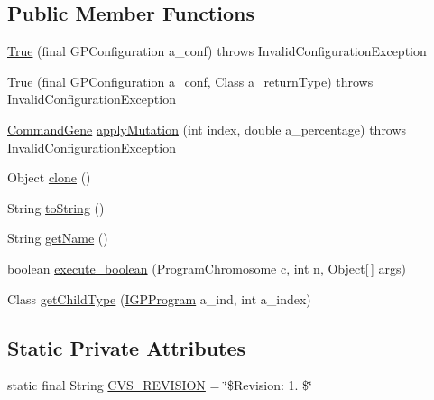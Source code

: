 \subsection*{Public Member Functions}
\begin{DoxyCompactItemize}
\item 
\hyperlink{classorg_1_1jgap_1_1gp_1_1terminal_1_1_true_a158a3e9011bb61e25eba96c3f6dec32f}{True} (final G\-P\-Configuration a\-\_\-conf)  throws Invalid\-Configuration\-Exception 
\item 
\hyperlink{classorg_1_1jgap_1_1gp_1_1terminal_1_1_true_ad1b44a3b970766b2ba8964f0914de178}{True} (final G\-P\-Configuration a\-\_\-conf, Class a\-\_\-return\-Type)  throws Invalid\-Configuration\-Exception 
\item 
\hyperlink{classorg_1_1jgap_1_1gp_1_1_command_gene}{Command\-Gene} \hyperlink{classorg_1_1jgap_1_1gp_1_1terminal_1_1_true_a916567d5d3517322184070c9fa468c34}{apply\-Mutation} (int index, double a\-\_\-percentage)  throws Invalid\-Configuration\-Exception 
\item 
Object \hyperlink{classorg_1_1jgap_1_1gp_1_1terminal_1_1_true_a491afe48eab8682fb9785a39e830c496}{clone} ()
\item 
String \hyperlink{classorg_1_1jgap_1_1gp_1_1terminal_1_1_true_af25df6de7cce1e53ef128273058a4a81}{to\-String} ()
\item 
String \hyperlink{classorg_1_1jgap_1_1gp_1_1terminal_1_1_true_a8f3a2e6dd8940ea041326604b5e6ee99}{get\-Name} ()
\item 
boolean \hyperlink{classorg_1_1jgap_1_1gp_1_1terminal_1_1_true_adb652c54d7c6ba735438712587ceb696}{execute\-\_\-boolean} (Program\-Chromosome c, int n, Object\mbox{[}$\,$\mbox{]} args)
\item 
Class \hyperlink{classorg_1_1jgap_1_1gp_1_1terminal_1_1_true_ad7813731ecd7b453223ac9b369b43fdc}{get\-Child\-Type} (\hyperlink{interfaceorg_1_1jgap_1_1gp_1_1_i_g_p_program}{I\-G\-P\-Program} a\-\_\-ind, int a\-\_\-index)
\end{DoxyCompactItemize}
\subsection*{Static Private Attributes}
\begin{DoxyCompactItemize}
\item 
static final String \hyperlink{classorg_1_1jgap_1_1gp_1_1terminal_1_1_true_ab3e972626bc4bcff94545eb64f030034}{C\-V\-S\-\_\-\-R\-E\-V\-I\-S\-I\-O\-N} = \char`\"{}\$Revision\-: 1. \$\char`\"{}
\end{DoxyCompactItemize}
